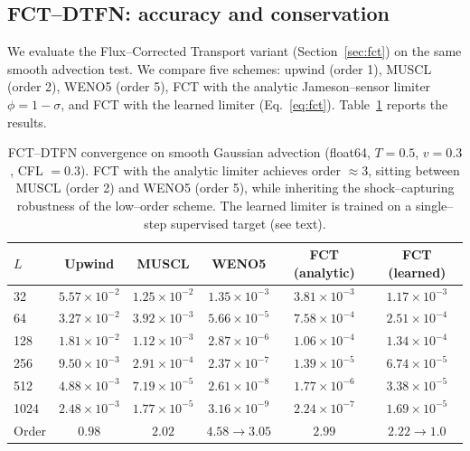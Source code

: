 \documentclass[10pt]{article}
\theoremstyle{definition}
\theoremstyle{remark}
\begin{document}
\subsection{FCT--DTFN: accuracy and conservation}
\label{sec:exp-fct}

We evaluate the Flux--Corrected Transport variant
(Section~\ref{sec:fct}) on the same smooth advection test.  We compare
five schemes: upwind (order 1), MUSCL (order 2), WENO5 (order 5),
FCT with the analytic Jameson--sensor limiter $\phi = 1 - \sigma$, and
FCT with the learned limiter (Eq.~\eqref{eq:fct}).
Table~\ref{tab:fct-order} reports the results.

\begin{table}[h]
  \centering
  \caption{FCT--DTFN convergence on smooth Gaussian advection
    (float64, $T = 0.5$, $v = 0.3$, CFL $= 0.3$).  FCT with the
    analytic limiter achieves order $\approx 3$, sitting between
    MUSCL (order 2) and WENO5 (order 5), while inheriting the
    shock--capturing robustness of the low--order scheme.  The
    learned limiter is trained on a single--step supervised target
    (see text).}
  \label{tab:fct-order}
  \begin{tabular}{lccccc}
    \toprule
    $L$ & Upwind & MUSCL & WENO5 & FCT (analytic) & FCT (learned) \\
    \midrule
    32   & $5.57 \times 10^{-2}$ & $1.25 \times 10^{-2}$ & $1.35 \times 10^{-3}$ & $3.81 \times 10^{-3}$ & $1.17 \times 10^{-3}$ \\
    64   & $3.27 \times 10^{-2}$ & $3.92 \times 10^{-3}$ & $5.66 \times 10^{-5}$ & $7.58 \times 10^{-4}$ & $2.51 \times 10^{-4}$ \\
    128  & $1.81 \times 10^{-2}$ & $1.12 \times 10^{-3}$ & $2.87 \times 10^{-6}$ & $1.06 \times 10^{-4}$ & $1.34 \times 10^{-4}$ \\
    256  & $9.50 \times 10^{-3}$ & $2.91 \times 10^{-4}$ & $2.37 \times 10^{-7}$ & $1.39 \times 10^{-5}$ & $6.74 \times 10^{-5}$ \\
    512  & $4.88 \times 10^{-3}$ & $7.19 \times 10^{-5}$ & $2.61 \times 10^{-8}$ & $1.77 \times 10^{-6}$ & $3.38 \times 10^{-5}$ \\
    1024 & $2.48 \times 10^{-3}$ & $1.77 \times 10^{-5}$ & $3.16 \times 10^{-9}$ & $2.24 \times 10^{-7}$ & $1.69 \times 10^{-5}$ \\
    \midrule
    Order & $0.98$ & $2.02$ & $4.58\!\to\!3.05$ & $2.99$ & $2.22\!\to\!1.0$ \\
    \bottomrule
  \end{tabular}
\end{table}
\end{document}
